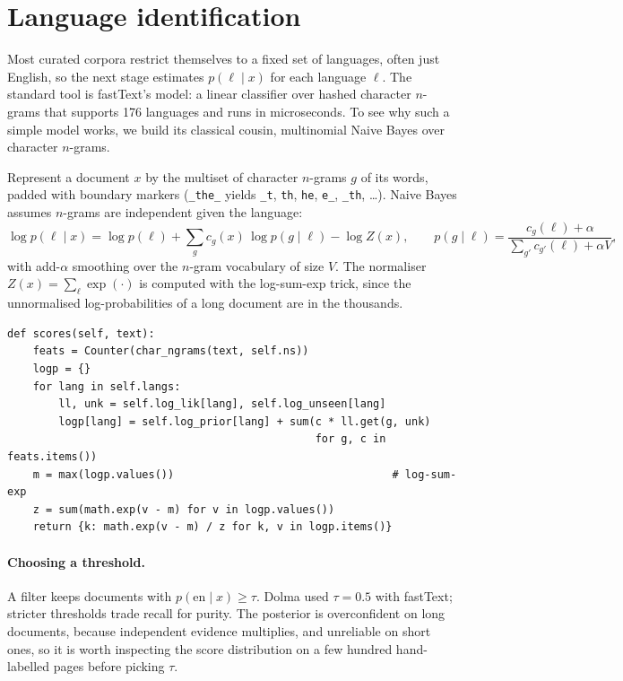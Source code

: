 \section{Language identification}\label{sec:data:langid}

Most curated corpora restrict themselves to a fixed set of languages, often just English, so the
next stage estimates $p(\ell\mid x)$ for each language $\ell$. The standard tool is fastText's
 model: a linear classifier over hashed character $n$-grams that supports 176
languages and runs in microseconds. To see why such a simple model works, we build its classical
cousin, multinomial Naive Bayes over character $n$-grams.

Represent a document $x$ by the multiset of character $n$-grams $g$ of its words, padded with
boundary markers (\texttt{\_the\_} yields \texttt{\_t}, \texttt{th}, \texttt{he}, \texttt{e\_},
\texttt{\_th}, \ldots). Naive Bayes assumes $n$-grams are independent given the language:
\begin{equation}
\log p(\ell\mid x) = \log p(\ell) + \sum_{g} c_g(x)\,\log p(g\mid\ell) - \log Z(x),
\qquad
p(g\mid\ell) = \frac{c_g(\ell) + \alpha}{\sum_{g'} c_{g'}(\ell) + \alpha V},
\label{eq:data:nb}
\end{equation}
with add-$\alpha$ smoothing over the $n$-gram vocabulary of size $V$. The normaliser
$Z(x)=\sum_\ell \exp(\cdot)$ is computed with the log-sum-exp trick, since the unnormalised
log-probabilities of a long document are in the thousands.

\begin{lstlisting}[caption={Naive Bayes posterior over languages (from \code{llmsys/datapipe/classify.py}).},label={lst:data:nb}]
def scores(self, text):
    feats = Counter(char_ngrams(text, self.ns))
    logp = {}
    for lang in self.langs:
        ll, unk = self.log_lik[lang], self.log_unseen[lang]
        logp[lang] = self.log_prior[lang] + sum(c * ll.get(g, unk)
                                                for g, c in feats.items())
    m = max(logp.values())                                  # log-sum-exp
    z = sum(math.exp(v - m) for v in logp.values())
    return {k: math.exp(v - m) / z for k, v in logp.items()}
\end{lstlisting}

\paragraph{Choosing a threshold.} A filter keeps documents with $p(\text{en}\mid x)\ge\tau$.
Dolma used $\tau=0.5$ with fastText; stricter thresholds trade recall for purity. The posterior is
overconfident on long documents, because independent evidence multiplies, and unreliable on short ones, so it is
worth inspecting the score distribution on a few hundred hand-labelled pages before picking $\tau$.

